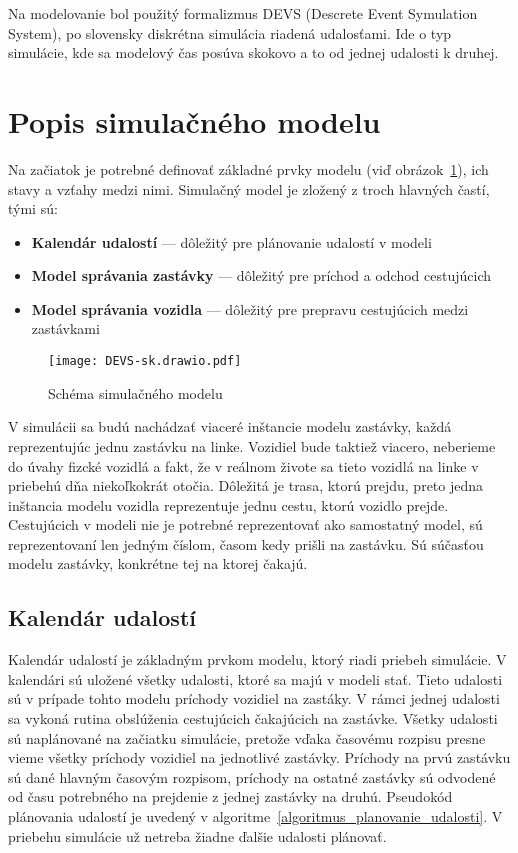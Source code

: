 Na modelovanie bol použitý formalizmus DEVS (Descrete Event Symulation System), po slovensky diskrétna simulácia riadená udalosťami.
Ide o typ simulácie, kde sa modelový čas posúva skokovo a to od jednej udalosti k druhej.

\section{Popis simulačného modelu}
Na začiatok je potrebné definovať základné prvky modelu (viď obrázok~\ref{fig:simulacny_model}), ich stavy a vzťahy medzi nimi.
Simulačný model je zložený z troch hlavných častí, tými sú:
\begin{itemize}
  \item \textbf{Kalendár udalostí} --- dôležitý pre plánovanie udalostí v modeli
  \item \textbf{Model správania zastávky} --- dôležitý pre príchod a odchod cestujúcich
  \item \textbf{Model správania vozidla} --- dôležitý pre prepravu cestujúcich medzi zastávkami
\end{itemize}

\begin{figure}[h]\label{fig:simulacny_model}
  \centering
  \texttt{[image: DEVS-sk.drawio.pdf]}
  \caption{Schéma simulačného modelu}
\end{figure}

V simulácii sa budú nachádzať viaceré inštancie modelu zastávky, každá reprezentujúc jednu zastávku na linke.
Vozidiel bude taktiež viacero, neberieme do úvahy fizcké vozidlá a fakt, že v reálnom živote sa tieto vozidlá na linke v priebehú dňa niekoľkokrát otočia.
Dôležitá je trasa, ktorú prejdu, preto jedna inštancia modelu vozidla reprezentuje jednu cestu, ktorú vozidlo prejde.
Cestujúcich v modeli nie je potrebné reprezentovať ako samostatný model, sú reprezentovaní len jedným číslom, časom kedy prišli na zastávku.
Sú súčasťou modelu zastávky, konkrétne tej na ktorej čakajú.

\subsection*{Kalendár udalostí}

Kalendár udalostí je základným prvkom modelu, ktorý riadi priebeh simulácie.
V kalendári sú uložené všetky udalosti, ktoré sa majú v modeli stať.
Tieto udalosti sú v prípade tohto modelu príchody vozidiel na zastáky.
V rámci jednej udalosti sa vykoná rutina obslúženia cestujúcich čakajúcich na zastávke.
Všetky udalosti sú naplánované na začiatku simulácie, pretože vďaka časovému rozpisu presne vieme všetky príchody vozidiel na jednotlivé zastávky.
Príchody na prvú zastávku sú dané hlavným časovým rozpisom, príchody na ostatné zastávky sú odvodené od času potrebného na prejdenie z jednej zastávky na druhú.
Pseudokód plánovania udalostí je uvedený v algoritme~\ref{algoritmus_planovanie_udalosti}.
V priebehu simulácie už netreba žiadne ďalšie udalosti plánovať.

